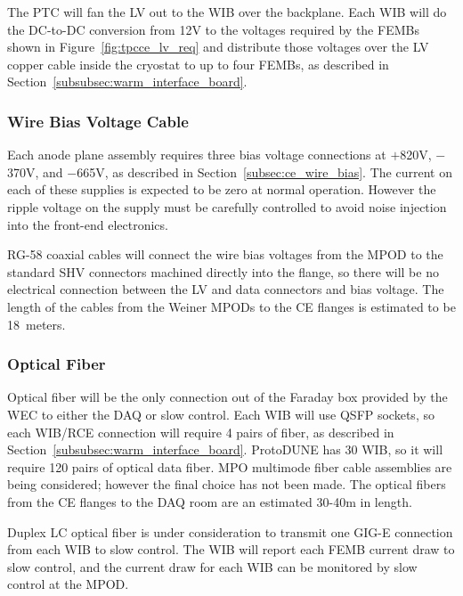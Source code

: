 The PTC will fan the LV out to the WIB over the backplane. Each WIB will do the DC-to-DC conversion
from 12V to the voltages required by the FEMBs shown in Figure~\ref{fig:tpcce_lv_req} and 
distribute those voltages over the LV copper cable inside the cryostat to up to four FEMBs, as described in 
Section~\ref{subsubsec:warm_interface_board}.

%
\subsubsection{Wire Bias Voltage Cable}
\label{subsubsec:ce_feedthrough_wirebias}

Each anode plane assembly requires three bias voltage connections 
at $+$820V, $-$370V, and $-$665V, as described in Section~\ref{subsec:ce_wire_bias}.
The current on each of these supplies is expected to be zero at normal operation.
However the ripple voltage on the supply must be carefully controlled 
to avoid noise injection into the front-end electronics.

RG-58 coaxial cables will connect the wire bias voltages from the MPOD to the standard SHV
connectors machined directly into the flange, so there will be no electrical connection between 
the LV and data connectors and bias voltage. The length of the cables from the Weiner MPODs
to the CE flanges is estimated to be 18~meters.

%
\subsubsection{Optical Fiber}
\label{subsubsec:ce_optical_fiber}

Optical fiber will be the only connection out of the Faraday box provided by the WEC to either 
the DAQ or slow control. Each WIB will use QSFP sockets, so each WIB/RCE connection will require 
4 pairs of fiber, as described in Section~\ref{subsubsec:warm_interface_board}.  ProtoDUNE has 
30 WIB, so it will require 120 pairs of optical data fiber. MPO multimode fiber cable assemblies 
are being considered; however the final choice has not been made. The optical fibers from
the CE flanges to the DAQ room are an estimated 30-40m in length.

Duplex LC optical fiber is under consideration to transmit one GIG-E connection from each
WIB to slow control. The WIB will report each FEMB current draw to slow control, and the 
current draw for each WIB can be monitored by slow control at the MPOD.

